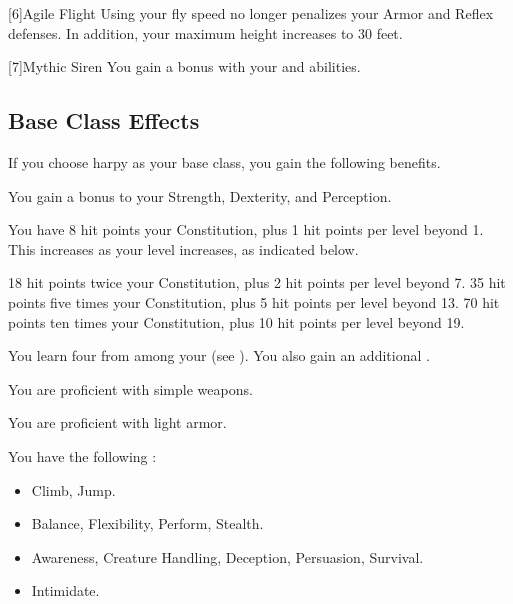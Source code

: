     [6]{Agile Flight} Using your fly speed no longer penalizes your Armor and Reflex defenses.
      In addition, your maximum height increases to 30 feet.

      [7]{Mythic Siren} You gain a   bonus with your  and  abilities.

  \subsection{Base Class Effects}
    If you choose harpy as your base class, you gain the following benefits.

     You gain a  bonus to your Strength, Dexterity, and Perception.

        You have 8 hit points \add  your Constitution, plus 1 hit points per level beyond 1.
        This increases as your level increases, as indicated below.
        \begin{itemize}
             18 hit points \add twice your Constitution, plus 2 hit points per level beyond 7.
             35 hit points \add five times your Constitution, plus 5 hit points per level beyond 13.
             70 hit points \add ten times your Constitution, plus 10 hit points per level beyond 19.
        \end{itemize}

      You learn four  from among your  (see ). You also gain an additional .

      You are proficient with simple weapons.

      You are proficient with light armor.

      You have the following :
      \begin{itemize}
        \item {} Climb, Jump.
        \item {} Balance, Flexibility, Perform, Stealth.
        \item {} Awareness, Creature Handling, Deception, Persuasion, Survival.
        \item {} Intimidate.
      \end{itemize}

